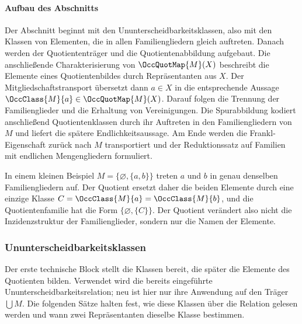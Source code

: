 \documentclass[main.tex]{subfiles}
\begin{document}
\paragraph{Aufbau des Abschnitts}

Der Abschnitt beginnt mit den Ununterscheidbarkeitsklassen, also mit den
Klassen von Elementen, die in allen Familiengliedern gleich auftreten. Danach
werden der Quotiententräger und die Quotientenabbildung aufgebaut. Die
anschließende Charakterisierung von \(\OccQuotMap{M}(X)\) beschreibt die
Elemente eines Quotientenbildes durch Repräsentanten aus \(X\). Der
Mitgliedschaftstransport übersetzt dann \(a\in X\) in die entsprechende Aussage
\(\OccClass{M}{a}\in\OccQuotMap{M}(X)\). Darauf folgen die Trennung der
Familienglieder und die Erhaltung von Vereinigungen. Die Spurabbildung kodiert
anschließend Quotientenklassen durch ihr Auftreten in den Familiengliedern von
\(M\) und liefert die spätere Endlichkeitsaussage. Am Ende werden die
Frankl-Eigenschaft zurück nach \(M\) transportiert und der Reduktionssatz auf
Familien mit endlichen Mengengliedern formuliert.

In einem kleinen Beispiel \(M=\{\varnothing,\{a,b\}\}\) treten \(a\) und
\(b\) in genau denselben Familiengliedern auf. Der Quotient ersetzt daher die
beiden Elemente durch eine einzige Klasse \(C=\OccClass{M}{a}
=\OccClass{M}{b}\), und die Quotientenfamilie hat die Form
\(\{\varnothing,\{C\}\}\). Der Quotient verändert also nicht die
Inzidenzstruktur der Familienglieder, sondern nur die Namen der Elemente.

\subsubsection{Ununterscheidbarkeitsklassen}

Der erste technische Block stellt die Klassen bereit, die später die Elemente
des Quotienten bilden. Verwendet wird die bereits eingeführte
Ununterscheidbarkeitsrelation; neu ist hier nur ihre Anwendung auf den Träger
\(\bigcup M\). Die folgenden Sätze halten fest, wie diese Klassen über die
Relation gelesen werden und wann zwei Repräsentanten dieselbe Klasse bestimmen.

\end{document}
